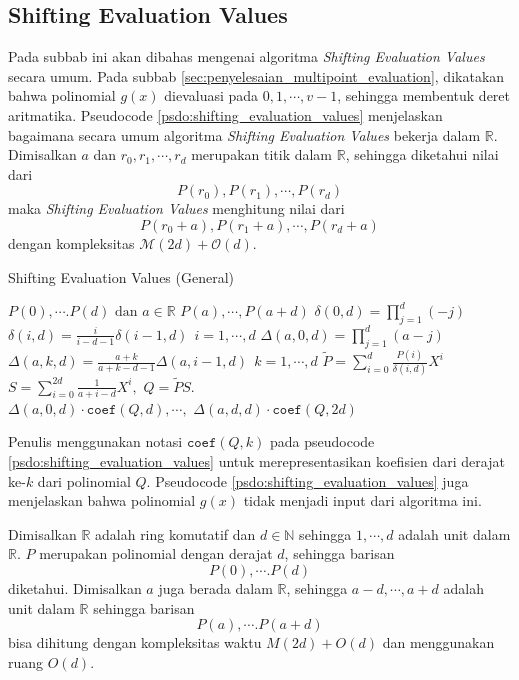 \subsection{ Shifting Evaluation Values}
Pada subbab ini akan dibahas mengenai algoritma \textit{Shifting Evaluation Values} secara umum. Pada subbab \ref{sec:penyelesaian_multipoint_evaluation}, dikatakan bahwa polinomial $ g(x) $ dievaluasi pada $ 0, 1, \cdots, v-1 $, sehingga membentuk deret aritmatika. Pseudocode \ref{psdo:shifting_evaluation_values} menjelaskan bagaimana secara umum algoritma \textit{Shifting Evaluation Values} bekerja dalam $ \mathbb{R} $. Dimisalkan $ a $ dan $ r_0, r_1, \cdots, r_d $ merupakan titik dalam $ \mathbb{R} $, sehingga diketahui nilai dari $$ P(r_0), P(r_1), \cdots, P(r_d) $$ maka \textit{Shifting Evaluation Values} menghitung nilai dari $$ P(r_0 + a), P(r_1 + a), \cdots, P(r_d + a) $$ dengan kompleksitas $ \mathcal{M}{(2d)} + \mathcal{O}{(d)} $.
\begin{algorithm}
	\caption{Shifting Evaluation Values (General)}
	\label{psdo:shifting_evaluation_values}
	\begin{algorithmic}[1]
		\Require $ P(0), \cdots. P(d) \text{ dan } a \in \mathbb{R} $
		\Ensure $ P(a), \cdots , P(a+d) $
		\State $ \delta(0,d) = \prod_{j=1}^d(-j) $
		\State $ \delta(i,d) = \frac{i}{i - d - 1} \delta(i-1,d)\ \ i = 1, \cdots, d$
		\State $ \Delta(a,0,d) = \prod_{j=1}^d(a-j) $
		\State $ \Delta(a,k,d) = \frac{a+k}{a+k - d - 1} \Delta(a,i-1,d)\ \ k = 1, \cdots, d $
		\State $ \tilde{P} = \sum_{i=0}^d \frac{P(i)}{\delta(i,d)} X^i $ 
		\State $ S = \sum_{i=0}^{2d} \frac{1}{a + i - d} X^i,$ 
		\State $ Q = \tilde{P}S. $ \\ 
		\Return $ \Delta(a,0,d)\cdot \texttt{coef}(Q,d), \cdots, $ $ \Delta(a,d,d)\cdot \texttt{coef}(Q,2d)  $
	\end{algorithmic}
\end{algorithm}

Penulis menggunakan notasi $ \texttt{coef}(Q,k) $ pada pseudocode \ref{psdo:shifting_evaluation_values} untuk merepresentasikan koefisien dari derajat ke-$k$ dari polinomial $Q$. Pseudocode \ref{psdo:shifting_evaluation_values} juga menjelaskan bahwa polinomial $ g(x) $ tidak menjadi input dari algoritma ini.

\begin{theo}
	\label{theo:shifting_evaluation_values}
	Dimisalkan $ \mathbb{R} $ adalah ring komutatif dan $ d \in \mathbb{N} $  sehingga $ 1, \cdots, d $ adalah unit dalam $ \mathbb{R} $. $ P $ merupakan polinomial dengan derajat $ d $, sehingga barisan 
	$$ P(0), \cdots. P(d) $$
	diketahui. Dimisalkan $ a $ juga berada dalam  $ \mathbb{R} $, sehingga $ a-d, \cdots, a+d $ adalah unit dalam $ \mathbb{R} $ sehingga barisan 
	$$ P(a), \cdots. P(a+d) $$
	bisa dihitung dengan kompleksitas waktu $ M(2d) + O(d) $ dan menggunakan ruang $ O(d) $.
\end{theo}

